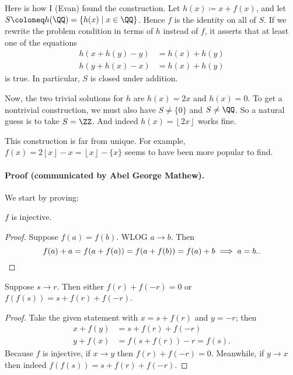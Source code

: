 \documentclass[11pt]{scrartcl}
\begin{document}
\begin{remark*}
  Here is how I (Evan) found the construction.
  Let $h(x) \coloneq x+f(x)$, and let $S \coloneq h(\QQ) = \{h(x) \mid x \in \QQ\}$.
  Hence $f$ is the identity on all of $S$.
  If we rewrite the problem condition in terms of $h$ instead of $f$,
  it asserts that at least one of the equations
  \begin{align*}
    h(x+h(y)-y) &= h(x)+h(y) \\
    h(y+h(x)-x) &= h(x)+h(y)
  \end{align*}
  is true.
  In particular, $S$ is closed under addition.

  Now, the two trivial solutions for $h$ are $h(x) = 2x$ and $h(x) = 0$.
  To get a nontrivial construction, we must also have $S \neq \{0\}$ and $S \neq \QQ$.
  So a natural guess is to take $S = \ZZ$.
  And indeed $h(x) = \left\lfloor 2x \right\rfloor$ works fine.
\end{remark*}
\begin{remark*}
  This construction is far from unique. For example,
  $f(x) = 2\left\lfloor x \right\rfloor - x = \left\lfloor x \right\rfloor - \{x\}$
  seems to have been more popular to find.
\end{remark*}

\paragraph{Proof (communicated by Abel George Mathew).}
We start by proving:
\begin{claim*}
  $f$ is injective.
\end{claim*}
\begin{proof}
  Suppose $f(a) = f(b)$. WLOG $a \to b$. Then
  \[ f(a)+a = f(a+f(a)) = f(a+f(b)) = f(a)+b \implies a=b. \qedhere. \]
\end{proof}

\begin{claim*}
  Suppose $s \to r$.
  Then either $f(r) + f(-r) = 0$ or $f(f(s)) = s+f(r)+f(-r)$.
\end{claim*}
\begin{proof}
  Take the given statement with $x = s+f(r)$ and $y = -r$; then
  \begin{align*}
    x + f(y) &= s + f(r) + f(-r) \\
    y + f(x) &= f(s+f(r)) - r = f(s).
  \end{align*}
  Because $f$ is injective, if $x \to y$ then $f(r) + f(-r) = 0$.
  Meanwhile, if $y \to x$ then indeed $f(f(s)) = s + f(r) + f(-r)$.
\end{proof}
\end{document}
